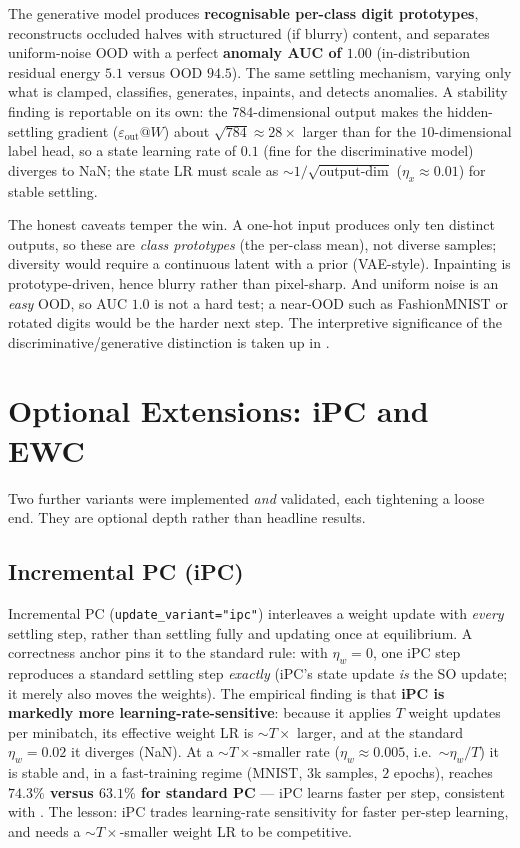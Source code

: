 The generative model produces \textbf{recognisable per-class digit prototypes}, reconstructs
occluded halves with structured (if blurry) content, and separates uniform-noise OOD with a perfect
\textbf{anomaly AUC of \(1.00\)} (in-distribution residual energy \(5.1\) versus OOD \(94.5\)). The
same settling mechanism, varying only what is clamped, classifies, generates, inpaints, and detects
anomalies. A stability finding is reportable on its own: the \(784\)-dimensional output makes the
hidden-settling gradient (\(\varepsilon_{\text{out}}@W\)) about \(\sqrt{784}\approx28\times\) larger
than for the \(10\)-dimensional label head, so a state learning rate of \(0.1\) (fine for the
discriminative model) diverges to NaN; the state LR must scale as \(\sim\!1/\sqrt{\text{output-dim}}\)
(\(\eta_x\approx0.01\)) for stable settling.

The honest caveats temper the win. A one-hot input produces only ten distinct outputs, so these are
\emph{class prototypes} (the per-class mean), not diverse samples; diversity would require a
continuous latent with a prior (VAE-style). Inpainting is prototype-driven, hence blurry rather than
pixel-sharp. And uniform noise is an \emph{easy} OOD, so AUC \(1.0\) is not a hard test; a near-OOD
such as FashionMNIST or rotated digits would be the harder next step. The interpretive significance
of the discriminative/generative distinction is taken up in .

\section{Optional Extensions: iPC and EWC}\label{sec:exp-depth}

Two further variants were implemented \emph{and} validated, each tightening a loose end. They are
optional depth rather than headline results.

\subsection{Incremental PC (iPC)}

Incremental PC \citep{salvatori2024ipc} (\texttt{update\_variant="ipc"}) interleaves a weight
update with \emph{every} settling step, rather than settling fully and updating once at
equilibrium. A correctness anchor pins it to the standard rule: with \(\eta_w=0\), one iPC step
reproduces a standard settling step \emph{exactly} (iPC's state update \emph{is} the SO update; it
merely also moves the weights). The empirical finding is that \textbf{iPC is markedly more
learning-rate-sensitive}: because it applies \(T\) weight updates per minibatch, its effective
weight LR is \(\sim\!T\times\) larger, and at the standard \(\eta_w=0.02\) it diverges (NaN). At a
\(\sim\!T\times\)-smaller rate (\(\eta_w\approx0.005\), i.e.\ \(\sim\!\eta_w/T\)) it is stable and,
in a fast-training regime (MNIST, \(3\)k samples, \(2\) epochs), reaches \textbf{\(74.3\%\) versus
\(63.1\%\) for standard PC} --- iPC learns faster per step, consistent with
\citet{salvatori2024ipc}. The lesson: iPC trades learning-rate sensitivity for faster per-step
learning, and needs a \(\sim\!T\times\)-smaller weight LR to be competitive.

